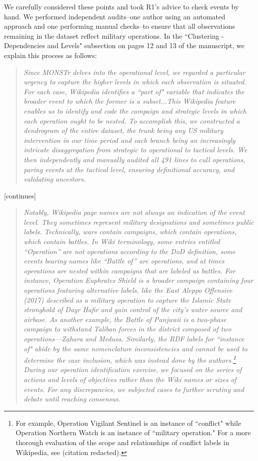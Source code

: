 \documentclass[fleqn,12pt]{article}
\begin{document}
We carefully considered these points and took R1's advice to check events by hand. We performed independent audits--one author using an automated approach and one performing manual checks--to ensure that all observations remaining in the dataset reflect military operations. In the ``Clustering - Dependencies and Levels" subsection on pages 12 and 13 of the manuscript, we explain this process as follows:

    \begin{quote}
    \textit{Since MONSTr delves into the operational level, we regarded a particular urgency to capture the higher levels in which each observation is situated. For each case, Wikipedia identifies a ``part of" variable that indicates the broader event to which the former is a subset...This Wikipedia feature enables us to identify and code the campaign and strategic levels in which each operation ought to be nested. To accomplish this, we constructed a dendrogram of the entire dataset, the trunk being any US military intervention in our time period and each branch being an increasingly intricate disaggregation from strategic to operational to tactical levels. We then independently and manually audited all 491 lines to cull operations, paring events at the tactical level, ensuring definitional accuracy, and validating ancestors.}
    \end{quote}
    
    [continues]
    
    \begin{quote}
    \textit{Notably, Wikipedia page names are not always an indication of the event level. They sometimes represent military designations and sometimes public labels. Technically, wars contain campaigns, which contain operations, which contain battles. In Wiki terminology, some entries entitled ``Operation” are not operations according to the DoD definition, some events bearing names like ``Battle of” are operations, and at times operations are nested within campaigns that are labeled as battles. For instance, Operation Euphrates Shield is a broader campaign containing four operations featuring alternative labels, like the East Aleppo Offensive (2017) described as a military operation to capture the Islamic State stronghold of Dayr Hafir and gain control of the city’s water source and airbase. As another example, the Battle of Panjwaii is a two-phase campaign to withstand Taliban forces in the district composed of two operations—Zahara and Medusa. Similarly, the RDF labels for ``instance of" abide by the same nomenclature inconsistencies and cannot be used to determine the case inclusion, which was instead done by the authors.\footnote{For example, Operation Vigilant Sentinel is an instance of ``conflict" while Operation Northern Watch is an instance of ``military operation." For a more thorough evaluation of the scope and relationships of conflict labels in Wikipedia, see (citation redacted).} During our operation identification exercise, we focused on the series of actions and levels of objectives rather than the Wiki names or sizes of events. For any discrepancies, we subjected cases to further scrutiny and debate until reaching consensus.}
    \end{quote}
\end{document}
